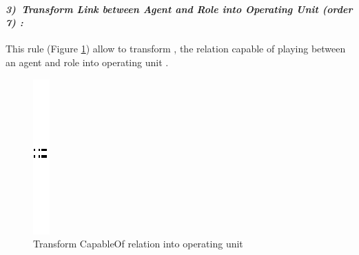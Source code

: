\paragraph{\emph{3)~Transform Link between Agent and Role into Operating Unit (order 7) :} } This rule (Figure \ref{fig:Operating Unit for every link capable of playing}) allow to transform , the relation capable of playing between an agent and role  into operating unit .
\vspace{1cm}
\begin{figure}[th]
	\centering
	\quad{}
		\includegraphics{Chapiter3/img/sep}
	\quad{}
\caption{\label{fig:Operating Unit for every link capable of playing}Transform CapableOf relation into operating unit} 
\end{figure}


